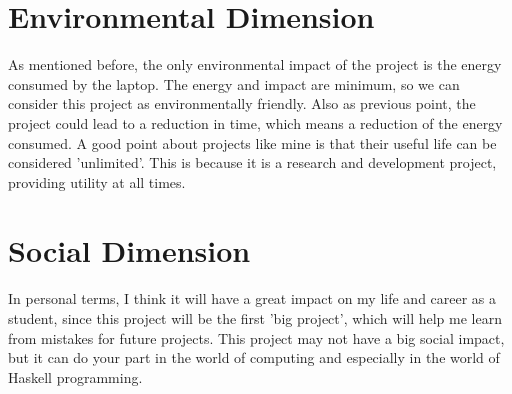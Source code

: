 \section{Environmental Dimension}
As mentioned before, the only environmental impact of the project is the energy consumed by the laptop. 
The energy and impact are minimum, so we can consider this project as environmentally friendly.
Also as previous point, the project could lead to a reduction in time, which means a reduction of the energy consumed.
A good point about projects like mine is that their useful life can be considered 'unlimited'.
This is because it is a research and development project, providing utility at all times.
\section{Social Dimension}
In personal terms, I think it will have a great impact on my life and career as a student, since this project will be the first 'big project', which will help me learn from mistakes for future projects.
This project may not have a big social impact, but it can do your part in the world of computing and especially in the world of Haskell programming.
